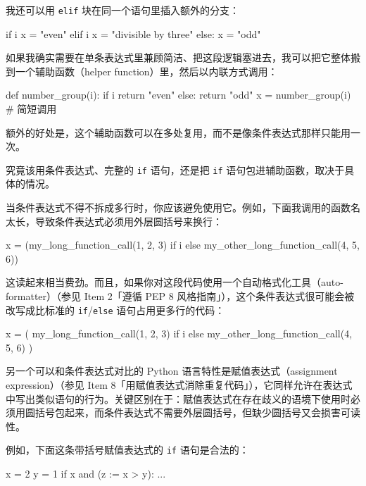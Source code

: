 我还可以用 \texttt{elif} 块在同一个语句里插入额外的分支：

\begin{codebox}[python]
if i %
    x = "even"
elif i %
    x = "divisible by three"
else:
    x = "odd"
\end{codebox}

如果我确实需要在单条表达式里兼顾简洁、把这段逻辑塞进去，我可以把它整体搬到一个辅助函数（helper function）里，然后以内联方式调用：

\begin{codebox}[python]
def number_group(i):
    if i %
        return "even"
    else:
        return "odd"
x = number_group(i)  # 简短调用
\end{codebox}

额外的好处是，这个辅助函数可以在多处复用，而不是像条件表达式那样只能用一次。

究竟该用条件表达式、完整的 \texttt{if} 语句，还是把 \texttt{if} 语句包进辅助函数，取决于具体的情况。

当条件表达式不得不拆成多行时，你应该避免使用它。例如，下面我调用的函数名太长，导致条件表达式必须用外层圆括号来换行：

\begin{codebox}[python]
x = (my_long_function_call(1, 2, 3) if i %
     else my_other_long_function_call(4, 5, 6))
\end{codebox}

这读起来相当费劲。而且，如果你对这段代码使用一个自动格式化工具（auto-formatter）（参见 Item 2「遵循 PEP 8 风格指南」），这个条件表达式很可能会被改写成比标准的 \texttt{if}/\texttt{else} 语句占用更多行的代码：

\begin{codebox}[python]
x = (
    my_long_function_call(1, 2, 3)
    if i %
    else my_other_long_function_call(4, 5, 6)
)
\end{codebox}

另一个可以和条件表达式对比的 Python 语言特性是赋值表达式（assignment expression）（参见 Item 8「用赋值表达式消除重复代码」），它同样允许在表达式中写出类似语句的行为。关键区别在于：赋值表达式在存在歧义的语境下使用时必须用圆括号包起来，而条件表达式不需要外层圆括号，但缺少圆括号又会损害可读性。

例如，下面这条带括号赋值表达式的 \texttt{if} 语句是合法的：

\begin{codebox}[python]
x = 2
y = 1
if x and (z := x > y):
    ...
\end{codebox}

